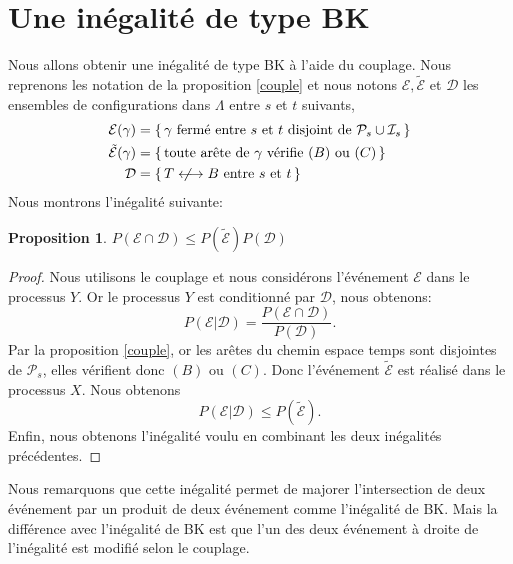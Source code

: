 \documentclass[titlepage,a4paper,12pt]{article}
\newcounter{prop}
\newtheorem{propo}[prop]{Proposition}
\newcommand{\nlongleftrightarrow}{\longleftrightarrow \kern-15pt\not \kern15pt}
\begin{document}
\section{Une inégalité de type BK}
Nous allons obtenir une inégalité de type BK à l'aide du couplage. Nous reprenons les notation de la proposition \ref{couple} et nous notons $\mathcal{E},\tilde{\mathcal{E}}$ et $\mathcal{D}$ les ensembles de configurations dans $\Lambda$ entre $s$ et $t$ suivants,
\begin{align*}
\mathcal{E}(\gamma)&=\{\,\gamma \text{ fermé entre }s \text{ et }t\text{ disjoint de }\mathcal{P}_s\cup \mathcal{I}_s\,\}\\
\tilde{\mathcal{E}}(\gamma)&=\{\,\text{toute arête de }\gamma\text{ vérifie } (B)\text{ ou }(C) \,\}\\
\mathcal{D}& = \{\,T\nlongleftrightarrow B \text{ entre }s \text{ et }t\,\}
\end{align*}
Nous montrons l'inégalité suivante:
\begin{propo} \label{BK'}
$P(\mathcal{E}\cap\mathcal{D})\leqslant P(\tilde{\mathcal{E}})P(\mathcal{D})$
\end{propo}
\begin{proof}
Nous utilisons le couplage et nous considérons l'événement $\mathcal{E}$ dans le processus $Y$. Or le processus $Y$ est conditionné par $\mathcal{D}$, nous obtenons:
$$P(\mathcal{E}|\mathcal{D}) = \frac{P(\mathcal{E}\cap\mathcal{D})}{P(\mathcal{D})}.
$$
Par la proposition \ref{couple}, or les arêtes du chemin espace temps sont disjointes de $\mathcal{P}_s$, elles vérifient donc $(B)$ ou $(C)$. Donc l'événement $\tilde{\mathcal{E}}$ est réalisé dans le processus $X$. Nous obtenons
$$ P(\mathcal{E}|\mathcal{D})\leqslant P(\tilde{\mathcal{E}}).
$$
Enfin, nous obtenons l'inégalité voulu en combinant les deux inégalités précédentes.
\end{proof}
Nous remarquons que cette inégalité permet de majorer l'intersection de deux événement par un produit de deux événement comme l'inégalité de BK. Mais la différence avec l'inégalité de BK est que l'un des deux événement à droite de l'inégalité est modifié selon le couplage. 
\end{document}
